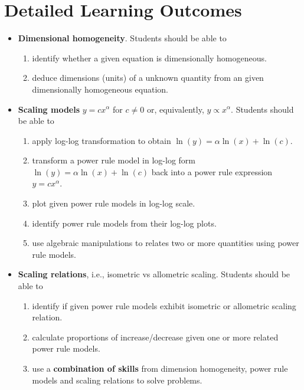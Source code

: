\documentclass[../main.tex]{subfiles}
\begin{document}
\section*{Detailed Learning Outcomes}
\begin{itemize}
  \item \textbf{Dimensional homogeneity}.  Students should be able to
    \begin{enumerate}
      \item identify whether a given equation is dimensionally homogeneous.
      \item deduce dimensions (units) of a unknown quantity from an given dimensionally homogeneous equation.
    \end{enumerate}

  \item \textbf{Scaling models} \(y = c x^{\alpha}\) for \(c \ne 0\) or, equivalently, \(y \propto x^{\alpha}\). Students should be able to 
    \begin{enumerate}
      \item apply log-log transformation to obtain \(\ln(y) = \alpha \ln(x) + \ln(c)\).
      \item transform a power rule model in log-log form \(\ln(y) = \alpha \ln(x) + \ln(c)\) back into a power rule expression \(y = c x^{\alpha}\).
      \item plot given power rule models in log-log scale.
      \item identify power rule models from their log-log plots.
      \item use algebraic manipulations to relates two or more quantities using power rule models.
    \end{enumerate}

  \item \textbf{Scaling relations}, i.e., isometric vs allometric scaling.  Students should be able to 
    \begin{enumerate}
      \item identify if given power rule models exhibit isometric or allometric scaling relation.
      \item calculate proportions of increase/decrease given one or more related power rule models.
      \item use a \textbf{combination of skills} from dimension homogeneity, power rule models and scaling relations to solve problems.
    \end{enumerate}


\end{itemize}
\end{document}
